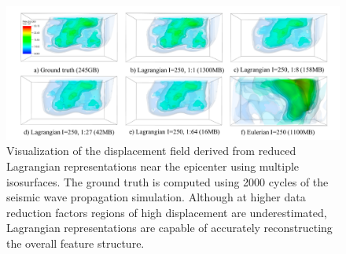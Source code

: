 \begin{figure}[!t]
\centering
\includegraphics[width=\linewidth, trim={1cm, 0cm, 0.9cm, 0cm}, clip]{Images/sw4_figure_small.pdf}
\vspace{-5mm}
\caption{Visualization of the displacement field derived from reduced Lagrangian representations near the epicenter using multiple isosurfaces. The ground truth is computed using 2000 cycles of the seismic wave propagation simulation. Although at higher data reduction factors regions of high displacement are underestimated, Lagrangian representations are capable of accurately reconstructing the overall feature structure.} 
\vspace{-5mm}
\label{fig:sw4_figure}
\end{figure}
